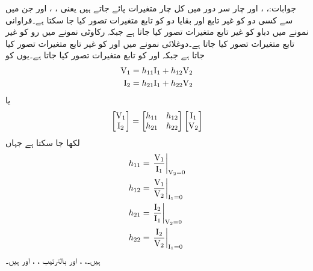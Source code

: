 جوابات:، ،  اور 
چار سر دور میں کل چار متغیرات پائے جاتے ہیں یعنی ، ،  اور  جن میں سے کسی دو کو غیر تابع اور بقایا دو کو تابع متغیرات تصور کیا جا سکتا ہے۔فراوانی نمونے  میں دباو کو غیر تابع متغیرات تصور کیا جاتا ہے جبکہ رکاوٹی  نمونے میں رو کو غیر تابع متغیرات تصور کیا جاتا ہے۔دوغلائی نمونے میں  اور  کو غیر تابع متغیرات تصور کیا جاتا ہے جبکہ  اور  کو تابع متغیرات تصور کیا جاتا ہے۔یوں  کو
\begin{gather}
\begin{aligned}\label{مساوات_چار_سر_دوغلائی_مساوی_الف}
{\ensuremath{{\textup{V}}}}_1&=h_{11} {{\textup{I}}}_1+h_{12}{{\textup{V}}}_2\\
{{\textup{I}}}_2&=h_{21}{{\textup{I}}}_1+h_{22}{{\textup{V}}}_2
\end{aligned}
\end{gather}
یا
\begin{align}
\begin{bmatrix}
{\ensuremath{{\textup{V}}}}_1\\
{{\textup{I}}}_2
\end{bmatrix}
=
\begin{bmatrix}
h_{11} & h_{12}\\
h_{21} & h_{22}
\end{bmatrix}
\begin{bmatrix}
{\ensuremath{{\textup{I}}}}_1\\
{{\textup{V}}}_2
\end{bmatrix}
\end{align}
لکھا جا سکتا ہے جہاں
\begin{gather}
\begin{aligned}
h_{11}&=\left. \frac{{{\textup{V}}}_1}{{{\textup{I}}}_1}\right|_{{{\textup{V}}}_2=0}\\
h_{12}&=\left. \frac{{{\textup{V}}}_1}{{{\textup{V}}}_2}\right|_{{{\textup{I}}}_1=0}\\
h_{21}&=\left. \frac{{{\textup{I}}}_2}{{{\textup{I}}}_1}\right|_{{{\textup{V}}}_2=0}\\
h_{22}&=\left. \frac{{{\textup{I}}}_2}{{{\textup{V}}}_2}\right|_{{{\textup{I}}}_1=0}
\end{aligned}
\end{gather}
ہیں۔، ،  اور  بالترتیب ، ،  اور  ہیں۔ 

